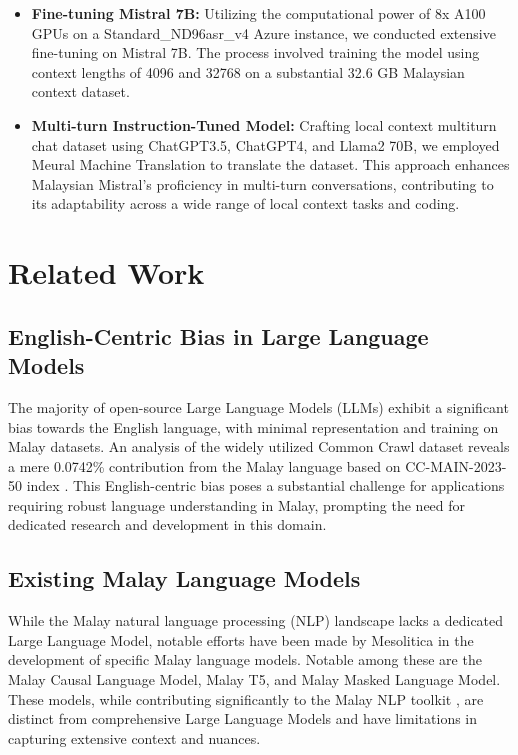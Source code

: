 \documentclass{article}
\begin{document}
\begin{itemize}
  \item \textbf{Fine-tuning Mistral 7B:} Utilizing the computational power of 8x A100 GPUs on a Standard\_ND96asr\_v4 Azure instance, we conducted extensive fine-tuning on Mistral 7B. The process involved training the model using context lengths of 4096 and 32768 on a substantial 32.6 GB Malaysian context dataset.

  \item \textbf{Multi-turn Instruction-Tuned Model:} Crafting local context multiturn chat dataset using ChatGPT3.5, ChatGPT4, and Llama2 70B, we employed Meural Machine Translation to translate the dataset. This approach enhances Malaysian Mistral's proficiency in multi-turn conversations, contributing to its adaptability across a wide range of local context tasks and coding.
\end{itemize}

\section{Related Work}

\subsection{English-Centric Bias in Large Language Models}

The majority of open-source Large Language Models (LLMs) exhibit a significant bias towards the English language, with minimal representation and training on Malay datasets. An analysis of the widely utilized Common Crawl dataset reveals a mere 0.0742\% contribution from the Malay language based on CC-MAIN-2023-50 index \cite{CommonCrawl}. This English-centric bias poses a substantial challenge for applications requiring robust language understanding in Malay, prompting the need for dedicated research and development in this domain.

\subsection{Existing Malay Language Models}

While the Malay natural language processing (NLP) landscape lacks a dedicated Large Language Model, notable efforts have been made by Mesolitica in the development of specific Malay language models. Notable among these are the Malay Causal Language Model, Malay T5, and Malay Masked Language Model. These models, while contributing significantly to the Malay NLP toolkit \cite{Malaya}, are distinct from comprehensive Large Language Models and have limitations in capturing extensive context and nuances.
\end{document}
